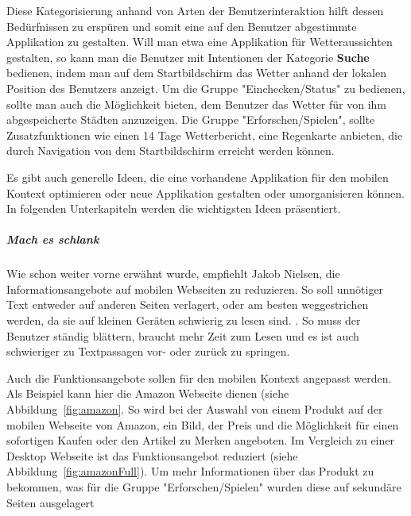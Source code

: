 Diese Kategorisierung anhand von Arten der Benutzerinteraktion hilft dessen Bedürfnissen zu erspüren und somit eine auf den Benutzer abgestimmte Applikation zu gestalten. Will man etwa eine Applikation für Wetteraussichten gestalten, so kann man die Benutzer mit Intentionen der Kategorie \textbf{Suche} bedienen, indem man auf dem Startbildschirm das Wetter anhand der lokalen Position des Benutzers anzeigt. Um die Gruppe "Einchecken/Status" zu bedienen, sollte man auch die Möglichkeit bieten, dem Benutzer das Wetter für von ihm abgespeicherte Städten anzuzeigen. Die Gruppe "Erforschen/Spielen", sollte Zusatzfunktionen wie einen 14 Tage Wetterbericht, eine Regenkarte anbieten, die durch Navigation von dem Startbildschirm erreicht werden können.

Es gibt auch generelle Ideen, die eine vorhandene Applikation für den mobilen Kontext optimieren oder neue Applikation gestalten oder umorganisieren können. In folgenden Unterkapiteln werden die wichtigsten Ideen präsentiert. 

\subparagraph{Mach es schlank} 
\label{subp:entferne_das_fett}

Wie schon weiter vorne erwähnt wurde, empfiehlt Jakob Nielsen, die Informationsangebote auf mobilen Webseiten zu reduzieren. So soll unnötiger Text entweder auf anderen Seiten verlagert, oder am besten weggestrichen werden, da sie auf kleinen Geräten schwierig zu lesen sind. \cite[Seite 102]{Nielsen:2012wj}. So muss der Benutzer ständig blättern, braucht mehr Zeit zum Lesen und es ist auch schwieriger zu Textpassagen vor- oder zurück zu springen.

Auch die Funktionsangebote sollen für den mobilen Kontext angepasst werden. Als Beispiel kann hier die Amazon Webseite dienen (siehe Abbildung~\ref{fig:amazon}. So wird bei der Auswahl von einem Produkt auf der mobilen Webseite von Amazon, ein Bild, der Preis und die Möglichkeit für einen sofortigen Kaufen oder den Artikel zu Merken angeboten. Im Vergleich zu einer Desktop Webseite ist das  Funktionsangebot reduziert (siehe Abbildung~\ref{fig:amazonFull}). Um mehr Informationen über das Produkt zu bekommen, was für die Gruppe "Erforschen/Spielen" wurden diese auf sekundäre Seiten ausgelagert

